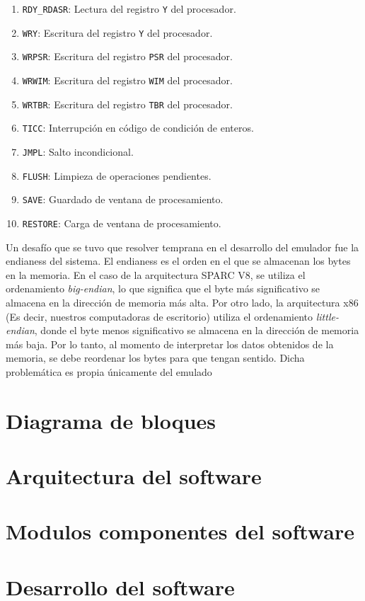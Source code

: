 \begin{enumerate}
\item \texttt{RDY\_RDASR}: Lectura del registro \texttt{Y} del procesador.

\item \texttt{WRY}: Escritura del registro \texttt{Y} del procesador.
\item \texttt{WRPSR}: Escritura del registro \texttt{PSR} del procesador.
\item \texttt{WRWIM}: Escritura del registro \texttt{WIM} del procesador.
\item \texttt{WRTBR}: Escritura del registro \texttt{TBR} del procesador.

\item \texttt{TICC}: Interrupción en código de condición de enteros.

\item \texttt{JMPL}: Salto incondicional.
\item \texttt{FLUSH}: Limpieza de operaciones pendientes.
\item \texttt{SAVE}: Guardado de ventana de procesamiento.
\item \texttt{RESTORE}: Carga de ventana de procesamiento.

\end{enumerate}


Un desafío que se tuvo que resolver temprana en el desarrollo del emulador fue la endianess del sistema. El endianess es el orden en el que se almacenan los bytes en la memoria. En el caso de la arquitectura SPARC V8, se utiliza el ordenamiento \textit{big-endian}, lo que significa que el byte más significativo se almacena en la dirección de memoria más alta. Por otro lado, la arquitectura x86 (Es decir, nuestros computadoras de escritorio) utiliza el ordenamiento \textit{little-endian}, donde el byte menos significativo se almacena en la dirección de memoria más baja. Por lo tanto, al momento de interpretar los datos obtenidos de la memoria, se debe reordenar los bytes para que tengan sentido. Dicha problemática es propia únicamente del emulado

\section{Diagrama de bloques}
\label{sec:diag_bloques}

\section{Arquitectura del software}
\label{sec:arquitectura_software}

\section{Modulos componentes del software}
\label{sec:modulos_componentes_software}


\section{Desarrollo del software}
\label{sec:desarrollo_software}

